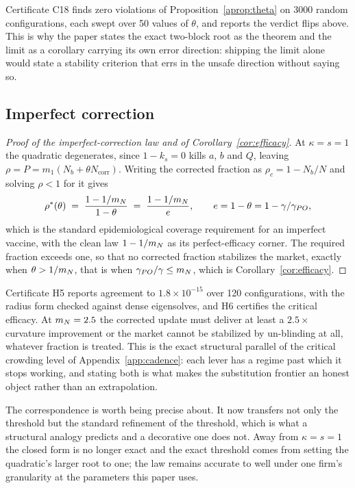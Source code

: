 Certificate C18 finds zero violations of Proposition~\ref{aprop:theta} on 3000 random configurations, each swept over 50 values of $\theta$, and reports the verdict flips above. This is why the paper states the exact two-block root as the theorem and the limit as a corollary carrying its own error direction: shipping the limit alone would state a stability criterion that errs in the unsafe direction without saying so.

\subsection{Imperfect correction}

\begin{proof}[Proof of the imperfect-correction law and of Corollary~\ref{cor:efficacy}]
At $\kappa = s = 1$ the quadratic degenerates, since $1-k_s = 0$ kills $a$, $b$ and $Q$, leaving $\rho = P = m_1(N_b + \theta N_{\text{corr}})$. Writing the corrected fraction as $\rho_c = 1 - N_b/N$ and solving $\rho < 1$ for it gives
\[
  \rho^\ast(\theta) \;=\; \frac{1 - 1/m_N}{1-\theta} \;=\; \frac{1-1/m_N}{e}, \qquad e = 1-\theta = 1 - \gamma/\gamma_{PO},
\]
which is the standard epidemiological coverage requirement for an imperfect vaccine, with the clean law $1-1/m_N$ as its perfect-efficacy corner. The required fraction exceeds one, so that no corrected fraction stabilizes the market, exactly when $\theta > 1/m_N$, that is when $\gamma_{PO}/\gamma \leq m_N$, which is Corollary~\ref{cor:efficacy}.
\end{proof}

Certificate H5 reports agreement to $1.8\times 10^{-15}$ over 120 configurations, with the radius form checked against dense eigensolves, and H6 certifies the critical efficacy. At $m_N = 2.5$ the corrected update must deliver at least a $2.5\times$ curvature improvement or the market cannot be stabilized by un-blinding at all, whatever fraction is treated. This is the exact structural parallel of the critical crowding level of Appendix~\ref{app:cadence}: each lever has a regime past which it stops working, and stating both is what makes the substitution frontier an honest object rather than an extrapolation.

The correspondence is worth being precise about. It now transfers not only the threshold but the standard refinement of the threshold, which is what a structural analogy predicts and a decorative one does not. Away from $\kappa = s = 1$ the closed form is no longer exact and the exact threshold comes from setting the quadratic's larger root to one; the law remains accurate to well under one firm's granularity at the parameters this paper uses.

